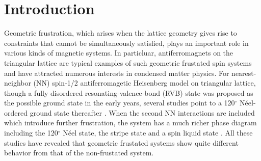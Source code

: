 \documentclass[aps,prb,reprint,amsfonts,amsmath,amssymb,showpacs,groupedaddress,superscriptaddress]{revtex4-1}
\begin{document}
\section{\label{sec:SectionI}Introduction}
Geometric frustration, which arises when the lattice geometry gives rise to constraints that cannot be simultaneously satisfied, plays an important role in various kinds of magnetic systems. In particluar, antiferromagnets on the triangular lattice are typical examples of such geometric frustated spin systems and have attracted numerous interests in condensed matter physics. For nearest-neighbor (NN) spin-1/2 antiferromagetic Heisenberg model on triangular lattice, though a fully disordered resonating-valence-bond (RVB) \cite{Anderson1973} state was proposed as the possible ground state in the early years, several studies point to a 120$^\circ$ N\'{e}el-ordered ground state thereafter \cite{PhysRevLett.99.127004,PhysRevLett.82.3899,PhysRevB.50.10048,PhysRevLett.60.2531}. When the second NN interactions are included which introduce further frustration, the system has a much richer phase diagram including the 120$^\circ$ N\'{e}el state, the stripe state and a spin liquid state \cite{PhysRevB.91.014426,PhysRevB.92.041105,PhysRevB.92.140403,PhysRevB.96.165141,PhysRevB.93.144411,JPSJ.83.093707,PhysRevB.96.075116,PhysRevB.94.121111,PhysRevLett.123.207203}. All these studies have revealed that geometric frustated systems show quite different behavior from that of the non-frustated system.
\end{document}
